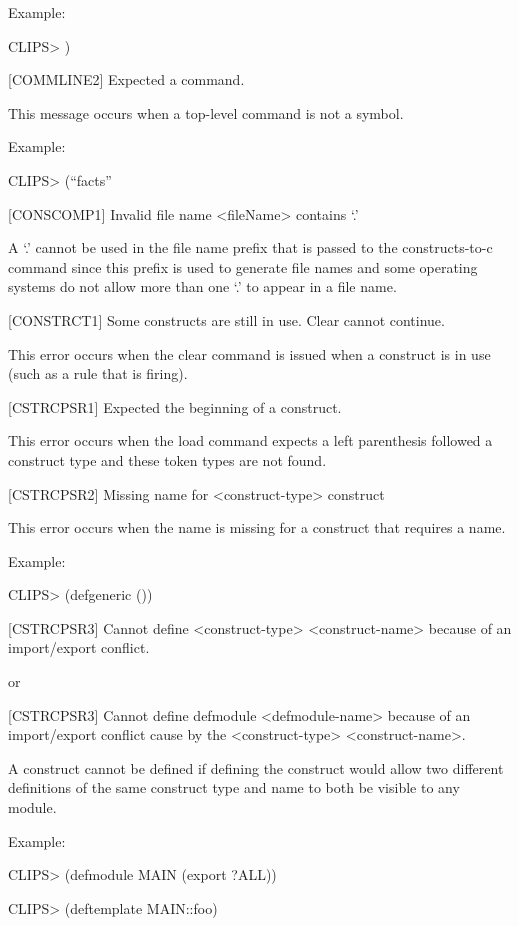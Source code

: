 \documentclass[letterpaper,10pt,english]{sphinxmanual}
\begin{document}
Example:

CLIPS\textgreater{} )

{[}COMMLINE2{]} Expected a command.

This message occurs when a top-level command is not a symbol.

Example:

CLIPS\textgreater{} (“facts”

{[}CONSCOMP1{]} Invalid file name \textless{}fileName\textgreater{} contains ‘.’

A ‘.’ cannot be used in the file name prefix that is passed to the
constructs-to-c command since this prefix is used to generate file names
and some operating systems do not allow more than one ‘.’ to appear in a
file name.

{[}CONSTRCT1{]} Some constructs are still in use. Clear cannot continue.

This error occurs when the clear command is issued when a construct is
in use (such as a rule that is firing).

{[}CSTRCPSR1{]} Expected the beginning of a construct.

This error occurs when the load command expects a left parenthesis
followed a construct type and these token types are not found.

{[}CSTRCPSR2{]} Missing name for \textless{}construct-type\textgreater{} construct

This error occurs when the name is missing for a construct that requires
a name.

Example:

CLIPS\textgreater{} (defgeneric ())

{[}CSTRCPSR3{]} Cannot define \textless{}construct-type\textgreater{} \textless{}construct-name\textgreater{} because of
an import/export conflict.

or

{[}CSTRCPSR3{]} Cannot define defmodule \textless{}defmodule-name\textgreater{} because of an
import/export conflict cause by the \textless{}construct-type\textgreater{} \textless{}construct-name\textgreater{}.

A construct cannot be defined if defining the construct would allow two
different definitions of the same construct type and name to both be
visible to any module.

Example:

CLIPS\textgreater{} (defmodule MAIN (export ?ALL))

CLIPS\textgreater{} (deftemplate MAIN::foo)
\end{document}
